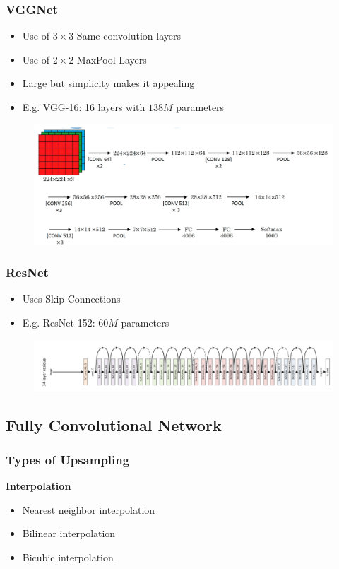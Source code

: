 \documentclass[10pt,a4paper]{article}
\newcommand{\props}{$\circ$}
\newcommand{\iprops}{\item[\props]}
\begin{document}
\subsubsection{VGGNet}
\begin{itemize}
	\iprops Use of $3 \times 3$ Same convolution layers
	\iprops Use of $2 \times 2$ MaxPool Layers
	\iprops Large but simplicity makes it appealing
	\iprops E.g. VGG-16: 16 layers with $138M$ parameters
\end{itemize}
\begin{figure}[H]
	\includegraphics[width=\columnwidth]{figures/vggnet.png}
\end{figure}

\subsubsection{ResNet}
\begin{itemize}
	\item Uses Skip Connections
	\iprops E.g. ResNet-152: $60M$ parameters
\end{itemize}
\begin{figure}[H]
	\includegraphics[width=\columnwidth]{figures/resnet.png}
\end{figure}

\subsection{Fully Convolutional Network}
\subsubsection{Types of Upsampling}
\textbf{Interpolation}
\begin{itemize}
	\item Nearest neighbor interpolation
	\item Bilinear interpolation
	\item Bicubic interpolation
\end{itemize}
\end{document}
